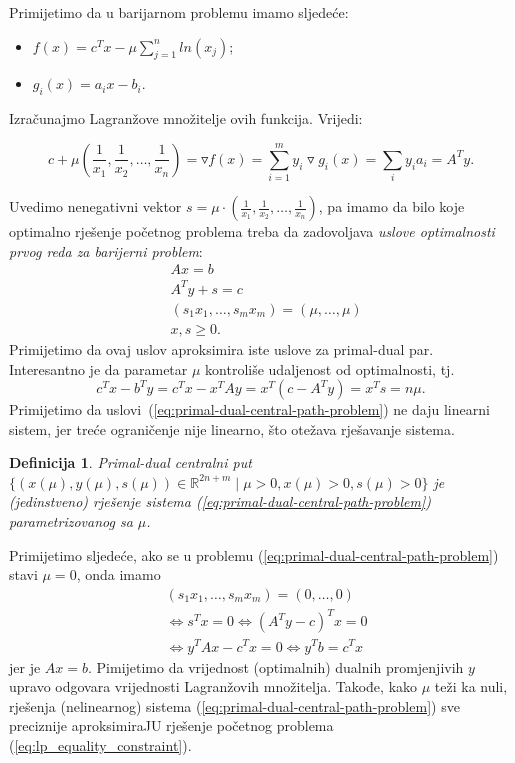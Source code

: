 \documentclass[b5paper, utf8, 11pt, colorlinks]{book}
\newtheorem{definition}{Definicija}[chapter]
\theoremstyle{definition}
\begin{document}
Primijetimo da u barijarnom problemu imamo sljedeće:
\begin{itemize}
	\item $f(x) =   c^T x - \mu \sum_{j=1}^n ln(x_j) $;
	\item $g_i(x) = a_i x - b_i$.
\end{itemize}
Izračunajmo Lagranžove množitelje ovih funkcija. Vrijedi:

$$c + \mu \left(\frac{1}{x_1}, \frac{1}{x_2}, \ldots, \frac{1}{x_n} \right) = \triangledown f (x) =\sum_{i=1}^m y_i \triangledown g_i(x) = \sum_{i} y_i a_i = A^T y.$$ 

Uvedimo nenegativni vektor $s =\mu \cdot \left(\frac{1}{x_1}, \frac{1}{x_2}, \ldots, \frac{1}{x_n}\right)$, pa imamo da bilo koje optimalno rješenje početnog problema treba da zadovoljava \emph{uslove optimalnosti prvog reda za barijerni problem}:
\begin{align}
	&A x = b \nonumber \\
	&A^T y + s = c  \nonumber \\
	& (s_1 x_1, \ldots, s_m x_m) = (\mu, \ldots, \mu) \label{eq:primal-dual-central-path-problem} \\
	& x, s \geq 0. \nonumber
\end{align}
Primijetimo da ovaj uslov aproksimira iste uslove za primal-dual par.  
Interesantno je da parametar $\mu$ kontroliše udaljenost od optimalnosti, tj. 
$$ c^T x - b^T y = c^T x - x^T A y = x^T(c- A^Ty ) = x^T s = n \mu.$$
Primijetimo da uslovi~(\ref{eq:primal-dual-central-path-problem}) ne daju linearni sistem, jer treće ograničenje  nije linearno, što otežava rješavanje sistema.

\begin{definition}
	Primal-dual centralni put $\{(x(\mu), y(\mu), s(\mu)) \in \mathbb{R}^{2n + m} \mid \mu > 0, x(\mu) >0, s(\mu)>0 \}$ je (jedinstveno) rješenje sistema  (\ref{eq:primal-dual-central-path-problem}) parametrizovanog sa $\mu$. 
\end{definition}

Primijetimo sljedeće, ako se u problemu (\ref{eq:primal-dual-central-path-problem}) stavi $\mu = 0$, onda imamo 
\begin{align*}
	&(s_1 x_1, \ldots, s_m x_m) = (0, \ldots, 0) \\
	&\Longleftrightarrow s^T x = 0  \Longleftrightarrow (A^T y - c)^T x = 0 \\
	&\Longleftrightarrow y^T A x - c^T x = 0 \Longleftrightarrow y^T b = c^Tx
\end{align*}
jer je $Ax = b$. Pimijetimo da   vrijednost (optimalnih) dualnih promjenjivih $y$ upravo odgovara vrijednosti Lagranžovih množitelja. Takođe, kako $\mu$ teži ka nuli,  rješenja (nelinearnog) sistema  (\ref{eq:primal-dual-central-path-problem})   sve preciznije aproksimiraJU rješenje početnog problema (\ref{eq:lp_equality_constraint}). 
\end{document}
